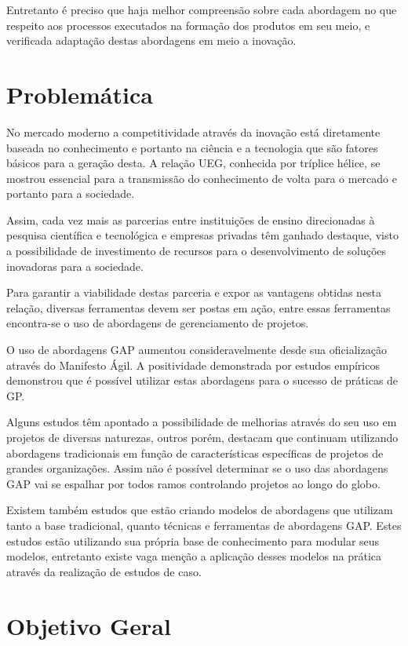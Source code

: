 Entretanto é preciso que haja melhor compreensão sobre cada abordagem no que respeito aos processos executados na formação dos produtos em seu meio, e verificada adaptação destas abordagens em meio a inovação.

\section{Problemática}

No mercado moderno a competitividade através da inovação está diretamente baseada no conhecimento e portanto na ciência e a tecnologia que são fatores básicos para a geração desta. A relação UEG, conhecida por tríplice hélice, se mostrou essencial para a transmissão do conhecimento de volta para o mercado e portanto para a sociedade.

Assim, cada vez mais as parcerias entre instituições de ensino direcionadas à pesquisa científica e tecnológica e empresas privadas têm ganhado destaque, visto a possibilidade de investimento de recursos para o desenvolvimento de soluções inovadoras para a sociedade.

Para garantir a viabilidade destas parceria e expor as vantagens obtidas nesta relação, diversas ferramentas devem ser postas em ação, entre essas ferramentas encontra-se o uso de abordagens de gerenciamento de projetos.

O uso de abordagens GAP aumentou consideravelmente desde sua oficialização através do Manifesto Ágil. A positividade demonstrada por estudos empíricos demonstrou que é possível utilizar estas abordagens para o sucesso de práticas de GP.

Alguns estudos têm apontado a possibilidade de melhorias através do seu uso em projetos de diversas naturezas, outros porém, destacam que continuam utilizando abordagens tradicionais em função de características específicas de projetos de grandes organizações. Assim não é possível determinar se o uso das abordagens GAP vai se espalhar por todos ramos controlando projetos ao longo do globo.

Existem também estudos que estão criando modelos de abordagens que utilizam tanto a base tradicional, quanto técnicas e ferramentas de abordagens GAP. Estes estudos estão utilizando sua própria base de conhecimento para modular seus modelos, entretanto existe vaga menção a aplicação desses modelos na prática através da realização de estudos de caso.


\section{Objetivo Geral}

